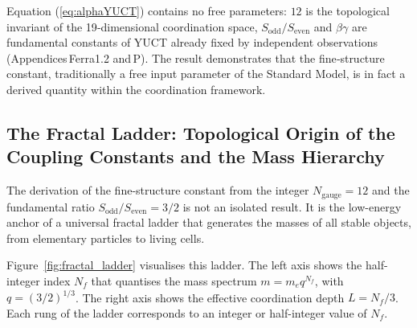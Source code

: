 \documentclass[12pt,a4paper]{article}
\begin{document}
	Equation (\ref{eq:alphaYUCT}) contains no free parameters: \(12\) is the topological invariant of the 19‑dimensional coordination space, \(S_{\mathrm{odd}}/S_{\mathrm{even}}\) and \(\beta\gamma\) are fundamental constants of YUCT already fixed by independent observations (Appendices Ferra1.2 and P).  
	The result demonstrates that the fine‑structure constant, traditionally a free input parameter of the Standard Model, is in fact a derived quantity within the coordination framework.
	
\subsection{The Fractal Ladder: Topological Origin of the Coupling Constants and the Mass Hierarchy}
\label{sec:fractal_ladder}

The derivation of the fine-structure constant from the integer \(N_{\mathrm{gauge}}=12\)
and the fundamental ratio \(S_{\mathrm{odd}}/S_{\mathrm{even}}=3/2\) is not an isolated
result.  It is the low-energy anchor of a universal fractal ladder that generates the
masses of all stable objects, from elementary particles to living cells.

Figure~\ref{fig:fractal_ladder} visualises this ladder.  The left axis shows the
half-integer index \(N_f\) that quantises the mass spectrum \(m = m_e q^{N_f}\),
with \(q = (3/2)^{1/3}\).  The right axis shows the effective coordination depth
\(L = N_f/3\).  Each rung of the ladder corresponds to an integer or half-integer
value of \(N_f\).
\end{document}
